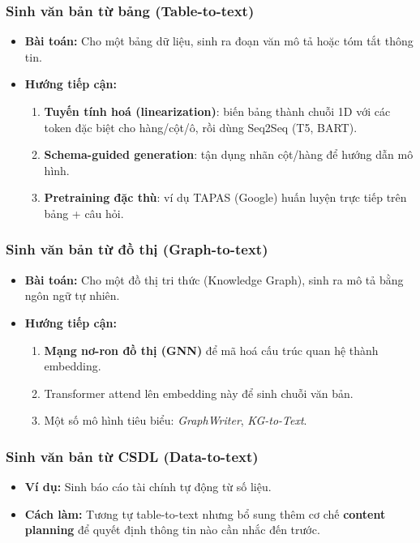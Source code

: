 \subsubsection{Sinh văn bản từ bảng (Table-to-text)}
\begin{itemize}
    \item \textbf{Bài toán:} Cho một bảng dữ liệu, sinh ra đoạn văn mô tả hoặc tóm tắt thông tin.
    \item \textbf{Hướng tiếp cận:}
    \begin{enumerate}
        \item \textbf{Tuyến tính hoá (linearization)}: biến bảng thành chuỗi 1D với các token đặc biệt cho hàng/cột/ô, rồi dùng Seq2Seq (T5, BART).
        \item \textbf{Schema-guided generation}: tận dụng nhãn cột/hàng để hướng dẫn mô hình.
        \item \textbf{Pretraining đặc thù}: ví dụ TAPAS (Google) huấn luyện trực tiếp trên bảng + câu hỏi.
    \end{enumerate}
\end{itemize}

\subsubsection{Sinh văn bản từ đồ thị (Graph-to-text)}
\begin{itemize}
    \item \textbf{Bài toán:} Cho một đồ thị tri thức (Knowledge Graph), sinh ra mô tả bằng ngôn ngữ tự nhiên.
    \item \textbf{Hướng tiếp cận:}
    \begin{enumerate}
        \item \textbf{Mạng nơ-ron đồ thị (GNN)} để mã hoá cấu trúc quan hệ thành embedding.
        \item Transformer attend lên embedding này để sinh chuỗi văn bản.
        \item Một số mô hình tiêu biểu: \textit{GraphWriter}, \textit{KG-to-Text}.
    \end{enumerate}
\end{itemize}

\subsubsection{Sinh văn bản từ CSDL (Data-to-text)}
\begin{itemize}
    \item \textbf{Ví dụ:} Sinh báo cáo tài chính tự động từ số liệu.
    \item \textbf{Cách làm:} Tương tự table-to-text nhưng bổ sung thêm cơ chế \textbf{content planning} để quyết định thông tin nào cần nhắc đến trước.
\end{itemize}
